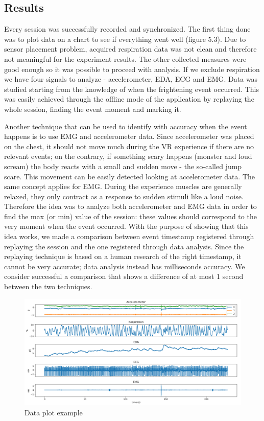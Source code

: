 \documentclass[binding=0.6cm,LaM]{sapthesis}
\begin{document}
\subsection{Results}
Every session was successfully recorded and synchronized. The first thing done was to plot data on a chart to see if everything went well (figure 5.3). Due to sensor placement problem, acquired respiration data was not clean and therefore not meaningful for the experiment results.
The other collected measures were good enough so it was possible to proceed with analysis. If we exclude respiration we have four signals to analyze - accelerometer, EDA, ECG and EMG. Data was studied starting from the knowledge of when the frightening event occurred. This was easily achieved through the offline mode of the application by replaying the whole session, finding the event moment and marking it.

Another technique that can be used to identify with accuracy when the event happens is to use EMG and accelerometer data. Since accelerometer was placed on the chest, it should not move much during the VR experience if there are no relevant events; on the contrary, if something scary happens (monster and loud scream) the body reacts with a small and sudden move - the so-called jump scare. This movement can be easily detected looking at accelerometer data. The same concept applies for EMG. During the experience muscles are generally relaxed, they only contract as a response to sudden stimuli like a loud noise. 
Therefore the idea was to analyze both accelerometer and EMG data in order to find the max (or min) value of the session: these values should correspond to the very moment when the event occurred. 
With the purpose of showing that this idea works, we made a comparison between event timestamp registered through replaying the session and the one registered through data analysis. Since the replaying technique is based on a human research of the right timestamp, it cannot be very accurate; data analysis instead has milliseconds accuracy. We consider successful a comparison that shows a difference of at most 1 second between the two techniques. 

\begin{figure}[p]
\centering
\includegraphics[scale=.68, angle=90]{images/plot}
\caption{Data plot example}
\end{figure}
\end{document}
